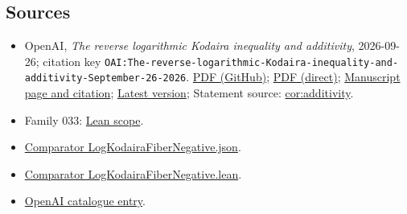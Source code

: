 \documentclass[11pt]{article}
\begin{document}
\subsection{Sources}
\begin{itemize}
\item OpenAI, \emph{The reverse logarithmic Kodaira inequality and additivity}, 2026-09-26; citation key \texttt{OAI:The-reverse-logarithmic-Kodaira-inequality-and-additivity-September-26-2026}. \href{https://github.com/openai/math/blob/adc7f1241b42e322a6451854ab7e4b4c146bf78a/preprints/The-reverse-logarithmic-Kodaira-inequality-and-additivity-September-26-2026/paper.pdf}{PDF (GitHub)}; \href{https://github.com/openai/math/raw/adc7f1241b42e322a6451854ab7e4b4c146bf78a/preprints/The-reverse-logarithmic-Kodaira-inequality-and-additivity-September-26-2026/paper.pdf}{PDF (direct)}; \href{https://github.com/openai/math/blob/adc7f1241b42e322a6451854ab7e4b4c146bf78a/preprints/The-reverse-logarithmic-Kodaira-inequality-and-additivity-September-26-2026/README.md}{Manuscript page and citation}; \href{https://github.com/openai/math/blob/main/preprints/The-reverse-logarithmic-Kodaira-inequality-and-additivity-September-26-2026/paper.pdf}{Latest version}; Statement source: \href{https://github.com/openai/math/blob/adc7f1241b42e322a6451854ab7e4b4c146bf78a/preprints/The-reverse-logarithmic-Kodaira-inequality-and-additivity-September-26-2026/build/sections/introduction.tex\#L51}{cor:additivity}.
\item Family 033: \href{https://github.com/openai/math/blob/adc7f1241b42e322a6451854ab7e4b4c146bf78a/lean/docs/033.md}{Lean scope}.
\item \href{https://github.com/openai/math/blob/adc7f1241b42e322a6451854ab7e4b4c146bf78a/lean/ComparatorChallenges/LogKodairaFiberNegative.json}{Comparator LogKodairaFiberNegative.json}.
\item \href{https://github.com/openai/math/blob/adc7f1241b42e322a6451854ab7e4b4c146bf78a/lean/ComparatorChallenges/LogKodairaFiberNegative.lean}{Comparator LogKodairaFiberNegative.lean}.
\item \href{https://github.com/openai/math/blob/adc7f1241b42e322a6451854ab7e4b4c146bf78a/CONTENTS.md}{OpenAI catalogue entry}.
\end{itemize}
\end{document}
